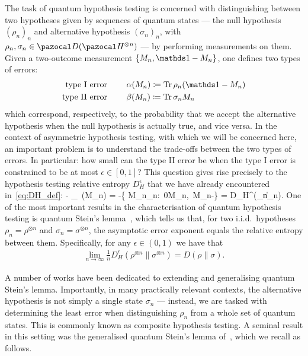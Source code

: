 \documentclass[11pt,notitlepage,tightenlines,nofootinbib,superscriptaddress]{revtex4-1}
\newcommand{\mario}[1]{{\color{red!60!black} #1}}
\newcommand{\deff}[1]{\textbf{\emph{#1}}}
\begin{document}
The task of quantum hypothesis testing is concerned with distinguishing between two hypotheses given by sequences of quantum states --- the null hypothesis $(\rho_n)_n$  and alternative hypothesis $(\sigma_n)_n$, with $\rho_n, \sigma_n \in \D(\HH^{\otimes n})$ --- by performing measurements on them. Given a two-outcome measurement $\{M_n, \id - M_n\}$, one defines two types of errors:
\begin{align}
\text{type I error } &\qquad \alpha(M_n) \coloneqq \Tr \rho_n (\id - M_n)\\
\text{type II error } &\qquad \beta(M_n) \coloneqq \Tr \sigma_n M_n
\end{align}
which correspond, respectively, to the probability that we accept the alternative hypothesis when the null hypothesis is actually true, and vice versa. In the context of asymmetric hypothesis testing, with which we will be concerned here, an important problem is to understand the trade-offs between the two types of errors. In particular: how small can the type II error be when the type I error is constrained to be at most $\epsilon \in [0,1]$? %
This question gives rise precisely to the hypothesis testing relative entropy $D^\epsilon_H$ that we have already encountered in~\eqref{eq:DH_def}:
\bb
- \log \min_{} \,\beta(M_n) = 
-\log \min\left\{ \Tr M_n\sigma_n:\, 0\leq M_n\leq \id,\ \Tr M_n\rho{}-\epsilon \right\} %
= D_H^\epsilon(\rho_n\|\sigma_n).
\ee
One of the most important results in the characterisation of quantum hypothesis testing is quantum Stein's lemma~\cite{Hiai1991,Ogawa2000}, which tells us that, for two i.i.d.\ hypotheses $\rho_n = \rho^{\otimes n}$ and $\sigma_n = \sigma^{\otimes n}$, the asymptotic error exponent equals the relative entropy between them. Specifically, for any $\epsilon \in (0,1)$ we have that
\begin{equation}\begin{aligned}
    \lim_{n\to\infty} \frac1n D^\epsilon_H\left(\rho^{\otimes n} \| \sigma^{\otimes n}\right) = D(\rho\|\sigma).
\end{aligned}\end{equation}

A number of works have been dedicated to extending and generalising quantum Stein's lemma. Importantly, in many practically relevant contexts, the alternative hypothesis is not simply a single state $\sigma_n$ --- instead, we are tasked with determining the least error when distinguishing $\rho_n$ from a whole set of quantum states. This is commonly known as composite hypothesis testing. A seminal result in this setting was the generalised quantum Stein's lemma of~\cite{Brandao2010}, which we recall as follows.
\end{document}

